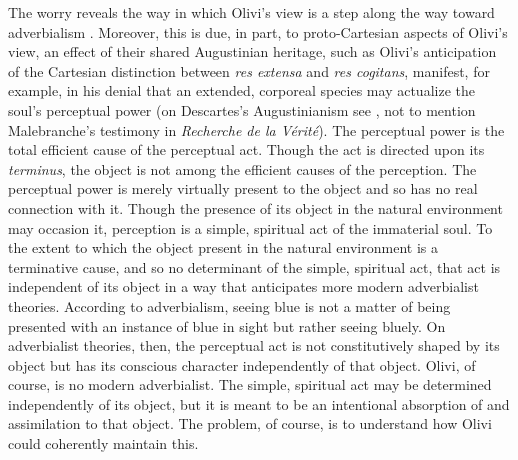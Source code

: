 The worry reveals the way in which Olivi's view is a step along the way toward adverbialism \citep[see][]{Ducasse:1942oq}. Moreover, this is due, in part, to proto-Cartesian aspects of Olivi's view, an effect of their shared Augustinian heritage, such as Olivi's anticipation of the Cartesian distinction between \emph{res extensa} and \emph{res cogitans}, manifest, for example, in his denial that an extended, corporeal species may actualize the soul's perceptual power (on Descartes's Augustinianism see \citealt{Menn:1998nr}, not to mention Malebranche's testimony in \emph{Recherche de la Vérité}). The perceptual power is the total efficient cause of the perceptual act. Though the act is directed upon its \emph{terminus}, the object is not among the efficient causes of the perception. The perceptual power is merely virtually present to the object and so has no real connection with it. Though the presence of its object in the natural environment may occasion it, perception is a simple, spiritual act of the immaterial soul. To the extent to which the object present in the natural environment is a terminative cause, and so no determinant of the simple, spiritual act, that act is independent of its object in a way that anticipates more modern adverbialist theories. According to adverbialism, seeing blue is not a matter of being presented with an instance of blue in sight but rather seeing bluely. On adverbialist theories, then, the perceptual act is not constitutively shaped by its object but has its conscious character independently of that object. Olivi, of course, is no modern adverbialist. The simple, spiritual act may be determined independently of its object, but it is meant to be an intentional absorption of and assimilation to that object. The problem, of course, is to understand how Olivi could coherently maintain this.

